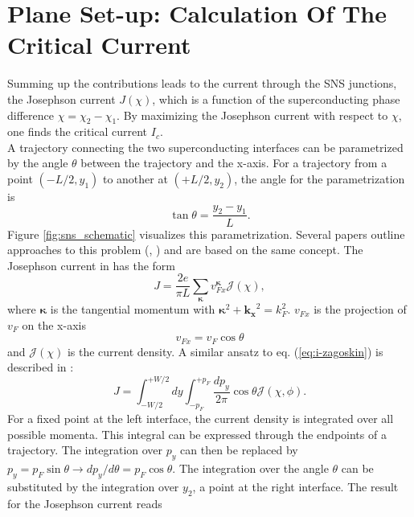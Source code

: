 \section{Plane Set-up: Calculation Of The Critical Current}
Summing up the contributions leads to the current through the SNS junctions, the Josephson current $J\left( \chi \right)$, which is a function of the superconducting phase difference $\chi = \chi_2 - \chi_1$. By maximizing the Josephson current with respect to $\chi$, one finds the critical current $I_c$.\\
A trajectory connecting the two superconducting interfaces can be parametrized by the angle $\theta$ between the trajectory and the x-axis. For a trajectory from a point $(-L/2, y_1)$ to another at $(+L/2, y_2)$, the angle for the parametrization is
\begin{equation}
\tan \theta = \frac{y_2 - y_1}{L}.
\label{eq:parametrization}
\end{equation}
Figure \ref{fig:sns_schematic} visualizes this parametrization. 
Several papers outline approaches to this problem (\cite{Zagoskin1997}, \cite{Barzykin1999}) and are based on the same concept. The Josephson current in \cite{Zagoskin1997} has the form
\begin{equation}
J =  \frac{2 e }{\pi L} \sum_{\bm{\kappa}}v^{\bm{\kappa}}_{Fx} \mathcal{J} \left(\chi\right), \label{eq:i-zagoskin}
\end{equation}
where $\bm{\kappa}$ is the tangential momentum with $\bm{\kappa}^2 + \mathbf{k_x}^2 = k_F^2$.
$v_{Fx}$ is the projection of $v_F$ on the x-axis
\begin{equation}
v_{Fx} =  v_F  \cos \theta
\end{equation}
and $\mathcal{J} \left( \chi \right)$ is the current density. A similar ansatz to eq. (\ref{eq:i-zagoskin}) is described in \cite{Meier2016}:
\begin{equation}
J =  \int_{-W/2}^{+W/2} dy \int_{-p_F}^{+p_F} \frac{dp_y}{2 \pi} \cos \theta \mathcal{J} \left( \chi, \phi \right).
\end{equation}
For a fixed point at the left interface, the current density is integrated over all possible momenta. This integral can be expressed through the endpoints of a trajectory. The integration over $p_y$ can then be replaced by $p_y = p_F \sin \theta \rightarrow d p_y/d\theta = p_F \cos \theta$. The integration over the angle $\theta$ can be substituted by the integration over $y_2$, a point at the right interface. The result for the Josephson current reads
